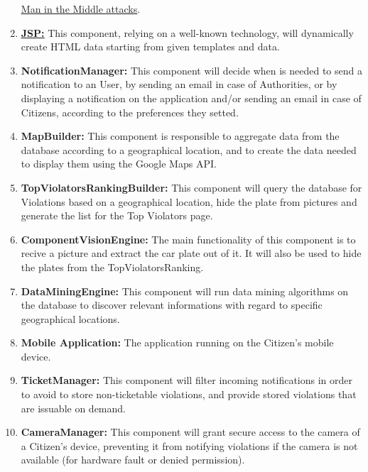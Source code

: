 \documentclass{article}
\newcommand{\enum}[1]{\texttt{#1.\arabic*}}
\newcommand{\link}[2]{{\color{blue}\underline{\href{#1}{#2}}}}
\begin{document}
\begin{enumerate}[label=\enum{COMP}]
		 	\link{https://en.wikipedia.org/wiki/Man-in-the-middle_attack}{Man in the Middle attacks}.
		 \item \label{component:JSP} \textbf{\link{https://en.wikipedia.org/wiki/JavaServer_Pages}{JSP:}}
		 	This component, relying on a well-known technology, will dynamically create HTML data starting from given templates and data.
		 \item \label{component:NotificationManager} \textbf{NotificationManager:}
		 	This component will decide when is needed to send a notification to an User, by sending an email in case of Authorities, or by displaying a notification 
		 	on the application and/or sending an email in case of Citizens, according to the preferences they setted.
		 \item \label{component:MapBuilder} \textbf{MapBuilder:}
		 	This component is responsible to aggregate data from the database according to a geographical location, and to create the data needed to display them
		 	using the Google Maps API.
		 \item \label{component:TopViolatorsRankingBuilder} \textbf{TopViolatorsRankingBuilder:}
		 	This component will query the database for Violations based on a geographical location, hide the plate from pictures and
		 	generate the list for the Top Violators page.
		 \item \label{component:ComputerVisionEngine} \textbf{ComponentVisionEngine:}
		 	The main functionality of this component is to recive a picture and extract the car plate out of it.
		 	It will also be used to hide the plates from the TopViolatorsRanking.
		 \item \label{component:DataMiningEngine} \textbf{DataMiningEngine:}
		 	This component will run data mining algorithms on the database to discover relevant informations with regard to specific geographical
		 	locations.
		 \item \label{component:MobileApplication} \textbf{Mobile Application:} The application running on the Citizen's mobile device.
		 \item \label{component:TicketManager} \textbf{TicketManager:}
		 	This component will filter incoming notifications in order to avoid to store non-ticketable violations, and provide stored violations that are
		 	issuable on demand.
		 \item \label{component:CameraManager} \textbf{CameraManager:}
		 	This component will grant secure access to the camera of a Citizen's device, preventing it from notifying violations if the camera is not 
		 	available (for hardware fault or denied permission).

\end{enumerate}
\end{document}
